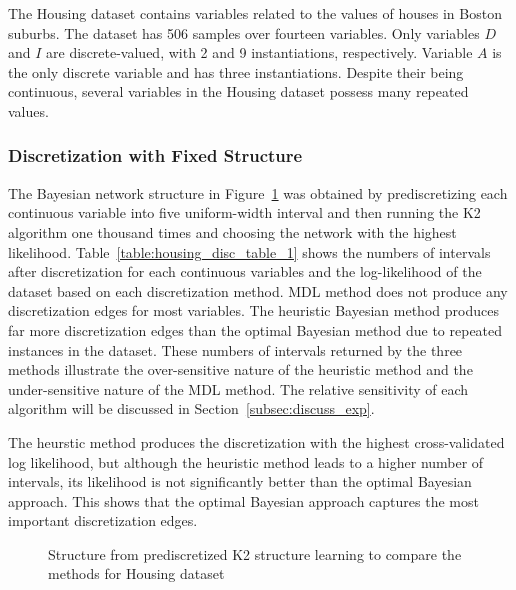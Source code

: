 The Housing dataset contains variables related to the values of houses in Boston suburbs.
The dataset has \num{506} samples over fourteen variables.
Only variables $D$ and $I$ are discrete-valued, with \num{2} and \num{9} instantiations, respectively.
Variable $A$ is the only discrete variable and has three instantiations.
Despite their being continuous, several variables in the Housing dataset possess many repeated values.

\subsubsection{Discretization with Fixed Structure}
\label{subsubsec:housing_exp1}

The Bayesian network structure in Figure~\ref{fig:housing_graph_1} was obtained by prediscretizing each continuous variable into five uniform-width interval and then running the K2 algorithm one thousand times and choosing the network with the highest likelihood.
Table~\ref{table:housing_disc_table_1} shows the numbers of intervals after discretization for each continuous variables and the log-likelihood of the dataset based on each discretization method.
MDL method does not produce any discretization edges for most variables.
The heuristic Bayesian method produces far more discretization edges than the optimal Bayesian method due to repeated instances in the dataset.
These numbers of intervals returned by the three methods illustrate the over-sensitive nature of the heuristic method and the under-sensitive nature of the MDL method.
The relative sensitivity of each algorithm will be discussed in Section~\ref{subsec:discuss_exp}.

The heurstic method produces the discretization with the highest cross-validated log likelihood, but although the heuristic method leads to a higher number of intervals, its likelihood is not significantly better than the optimal Bayesian approach.
This shows that the optimal Bayesian approach captures the most important discretization edges.

\begin{figure}[ht]
  \centering
  \scalebox{0.8}{}
  \caption{Structure from prediscretized K2 structure learning to compare the methods for Housing dataset}
  \label{fig:housing_graph_1}
\end{figure}

